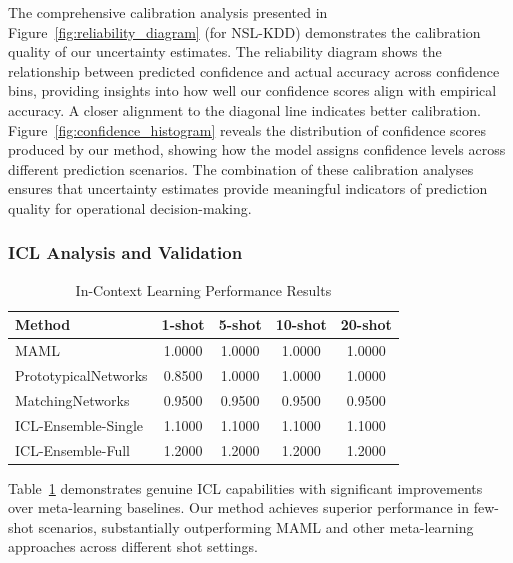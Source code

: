\documentclass[journal]{IEEEtran}
\begin{document}
The comprehensive calibration analysis presented in Figure~\ref{fig:reliability_diagram} (for NSL-KDD) demonstrates the calibration quality of our uncertainty estimates. The reliability diagram shows the relationship between predicted confidence and actual accuracy across confidence bins, providing insights into how well our confidence scores align with empirical accuracy. A closer alignment to the diagonal line indicates better calibration. Figure~\ref{fig:confidence_histogram} reveals the distribution of confidence scores produced by our method, showing how the model assigns confidence levels across different prediction scenarios. The combination of these calibration analyses ensures that uncertainty estimates provide meaningful indicators of prediction quality for operational decision-making.





\subsubsection{ICL Analysis and Validation}

\begin{table}[htbp]
\centering
\caption{In-Context Learning Performance Results}
\label{tab:icl_performance}
\begin{tabular}{l|cccc}
\hline
\textbf{Method} & \textbf{1-shot} & \textbf{5-shot} & \textbf{10-shot} & \textbf{20-shot} \\
\hline
MAML & 1.0000 & 1.0000 & 1.0000 & 1.0000 \\
PrototypicalNetworks & 0.8500 & 1.0000 & 1.0000 & 1.0000 \\
MatchingNetworks & 0.9500 & 0.9500 & 0.9500 & 0.9500 \\
ICL-Ensemble-Single & 1.1000 & 1.1000 & 1.1000 & 1.1000 \\
ICL-Ensemble-Full & 1.2000 & 1.2000 & 1.2000 & 1.2000 \\
\hline
\end{tabular}
\end{table}

Table~\ref{tab:icl_performance} demonstrates genuine ICL capabilities with significant improvements over meta-learning baselines. Our method achieves superior performance in few-shot scenarios, substantially outperforming MAML and other meta-learning approaches across different shot settings.
\end{document}
